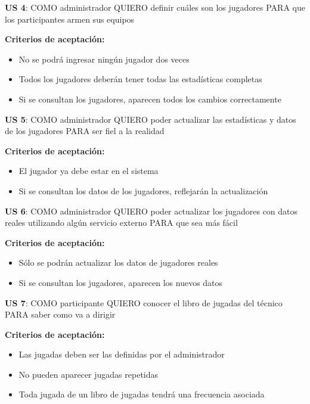 \begin{tcolorbox}
\textbf{US 4}: COMO administrador QUIERO definir cuáles son los jugadores PARA que los participantes armen sus equipos

\vline

\textbf{Criterios de aceptación:}
\begin{itemize}
\item No se podrá ingresar ningún jugador dos veces 
\item Todos los jugadores deberán tener todas las estadísticas completas 
\item Si se consultan los jugadores, aparecen todos los cambios correctamente 
\end{itemize}
\end{tcolorbox}
\vspace{10pt}


\begin{tcolorbox}
\textbf{US 5}: COMO administrador QUIERO poder actualizar las estadísticas y datos de los jugadores PARA ser fiel a la realidad

\vline

\textbf{Criterios de aceptación:}
\begin{itemize}
\item El jugador ya debe estar en el sistema 
\item Si se consultan los datos de los jugadores, reflejarán la actualización
\end{itemize}
\end{tcolorbox}
\vspace{10pt}


\begin{tcolorbox}
\textbf{US 6}: COMO administrador QUIERO poder actualizar los jugadores con datos reales utilizando algún servicio externo PARA que sea más fácil

\vline

\textbf{Criterios de aceptación:}
\begin{itemize}
\item Sólo se podrán actualizar los datos de jugadores reales
\item Si se consultan los jugadores, aparecen los nuevos datos 
\end{itemize}
\end{tcolorbox}
\vspace{10pt}


\begin{tcolorbox}
\textbf{US 7}: COMO participante QUIERO conocer el libro de jugadas del técnico PARA saber como va a dirigir

\vline

\textbf{Criterios de aceptación:}
\begin{itemize}
\item Las jugadas deben ser las definidas por el administrador
\item No pueden aparecer jugadas repetidas
\item Toda jugada de un libro de jugadas tendrá una frecuencia asociada
\end{itemize}
\end{tcolorbox}
\vspace{10pt}


